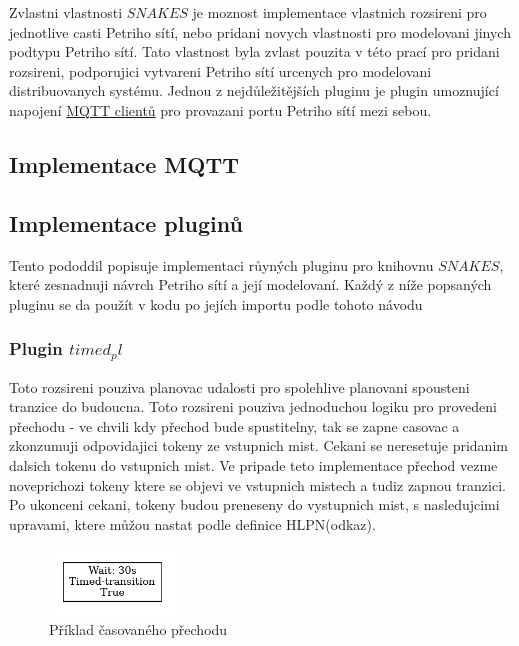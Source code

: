 Zvlastni vlastnosti $SNAKES$ je moznost implementace vlastnich rozsireni pro jednotlive casti Petriho sítí, nebo pridani novych vlastnosti pro modelovani jinych podtypu Petriho sítí. Tato vlastnost byla zvlast pouzita v této prací pro pridani rozsireni, podporujici vytvareni Petriho sítí urcenych pro modelovani distribuovanych systému.
Jednou z nejdůležitějších pluginu je plugin umoznující napojení \hyperref[sec:aplikace-mqtt]{MQTT clientů} pro provazani portu Petriho sítí mezi sebou.

\subsection{Implementace MQTT}
\label{subsec:mqtt_impl}



\subsection{Implementace pluginů}
\label{sec:plug-impl}
Tento pododdil popisuje implementaci růyných pluginu pro knihovnu $SNAKES$, které zesnadnuji návrch Petriho sítí a její modelovaní. Každý z níže popsaných pluginu se da  použít v kodu po jejích importu podle tohoto návodu 

\subsubsection{Plugin $timed_pl$}
\label{subsec:timed_pl}
Toto rozsireni pouziva planovac udalosti pro spolehlive planovani spousteni tranzice do budoucna. Toto rozsireni pouziva jednoduchou logiku pro provedeni přechodu - ve chvili kdy přechod bude spustitelny, tak se zapne casovac a zkonzumuji odpovidajici tokeny ze vstupnich mist. Cekani se neresetuje pridanim dalsich tokenu do vstupnich mist. Ve pripade teto implementace přechod vezme noveprichozi tokeny ktere se objevi ve vstupnich mistech a tudiz zapnou tranzici. Po ukonceni cekani, tokeny budou preneseny do vystupnich mist, s nasledujcimi upravami, ktere můžou nastat podle definice HLPN(odkaz).
\begin{figure}[hbt]
  \centering
  \includegraphics[width=0.3\textwidth]{obrazky-figures/timed-transition.png}
  \caption{Příklad časovaného přechodu}
  \label{timed-transition}
\end{figure}

